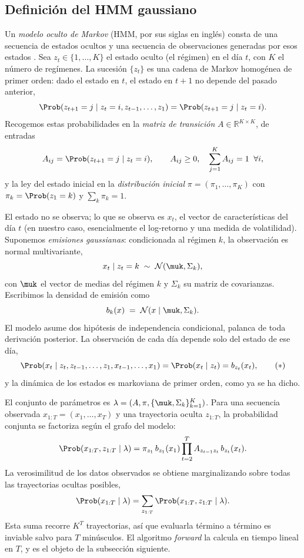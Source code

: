 \subsection{Definición del HMM gaussiano}
\label{sec:hmm-def}

Un \emph{modelo oculto de Markov} (HMM, por sus siglas en inglés) consta de una secuencia de estados ocultos y una secuencia de observaciones generadas por esos estados \cite{rabiner1989}. Sea $z_t \in \{1, \dots, K\}$ el estado oculto (el régimen) en el día $t$, con $K$ el número de regímenes. La sucesión $\{z_t\}$ es una cadena de Markov homogénea de primer orden: dado el estado en $t$, el estado en $t+1$ no depende del pasado anterior,
\[
\Prob(z_{t+1} = j \mid z_t = i, z_{t-1}, \dots, z_1) = \Prob(z_{t+1} = j \mid z_t = i).
\]
Recogemos estas probabilidades en la \emph{matriz de transición} $A \in \mathbb{R}^{K \times K}$, de entradas
\[
A_{ij} = \Prob(z_{t+1} = j \mid z_t = i), \qquad A_{ij} \ge 0, \quad \sum_{j=1}^{K} A_{ij} = 1 \;\;\forall i,
\]
y la ley del estado inicial en la \emph{distribución inicial} $\pi = (\pi_1, \dots, \pi_K)$ con $\pi_k = \Prob(z_1 = k)$ y $\sum_k \pi_k = 1$.

El estado no se observa; lo que se observa es $x_t$, el vector de características del día $t$ (en nuestro caso, esencialmente el log-retorno y una medida de volatilidad). Suponemos \emph{emisiones gaussianas}: condicionada al régimen $k$, la observación es normal multivariante,
\[
x_t \mid z_t = k \;\sim\; \mathcal{N}(\muk, \Sigma_k),
\]
con $\muk$ el vector de medias del régimen $k$ y $\Sigma_k$ su matriz de covarianzas. Escribimos la densidad de emisión como
\[
b_k(x) \;=\; \mathcal{N}(x \mid \muk, \Sigma_k).
\]
El modelo asume dos hipótesis de independencia condicional, palanca de toda derivación posterior. La observación de cada día depende solo del estado de ese día,
\[
\Prob(x_t \mid z_t, z_{t-1}, \dots, z_1, x_{t-1}, \dots, x_1) = \Prob(x_t \mid z_t) = b_{z_t}(x_t),
\tag{$\ast$}
\]
y la dinámica de los estados es markoviana de primer orden, como ya se ha dicho.

El conjunto de parámetros es $\lambda = (A, \pi, \{\muk, \Sigma_k\}_{k=1}^{K})$. Para una secuencia observada $x_{1:T} = (x_1, \dots, x_T)$ y una trayectoria oculta $z_{1:T}$, la probabilidad conjunta se factoriza según el grafo del modelo:
\[
\Prob(x_{1:T}, z_{1:T} \mid \lambda)
= \pi_{z_1}\, b_{z_1}(x_1) \prod_{t=2}^{T} A_{z_{t-1} z_t}\, b_{z_t}(x_t).
\]
La verosimilitud de los datos observados se obtiene marginalizando sobre todas las trayectorias ocultas posibles,
\[
\Prob(x_{1:T} \mid \lambda) = \sum_{z_{1:T}} \Prob(x_{1:T}, z_{1:T} \mid \lambda).
\]
Esta suma recorre $K^T$ trayectorias, así que evaluarla término a término es inviable salvo para $T$ minúsculos. El algoritmo \emph{forward} la calcula en tiempo lineal en $T$, y es el objeto de la subsección siguiente.

